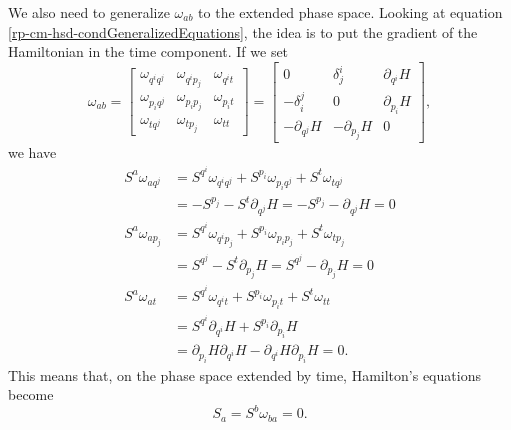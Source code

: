We also need to generalize $\omega_{ab}$ to the extended phase space. Looking at equation \ref{rp-cm-hsd-condGeneralizedEquations}, the idea is to put the gradient of the Hamiltonian in the time component. If we set
\begin{equation}\label{rp-cm-lm-contactForm}
	\tag{SF-E}
	\omega_{ab} = \left[\begin{array}{ccc}
		\omega_{q^i q^j} & \omega_{q^i p_j} & \omega_{q^i t} \\
		\omega_{p_i q^j} & \omega_{p_i p_j} & \omega_{p_i t} \\
		\omega_{t q^j} & \omega_{t p_j} & \omega_{t t} 
	\end{array} \right]= \left[\begin{array}{ccc}
		0 & \delta^i_j & \partial_{q^i} H \\
		- \delta_i^j & 0 & \partial_{p_i} H \\
		- \partial_{q^j} H & -\partial_{p_j} H & 0
	\end{array} \right] ,
\end{equation}
we have
\begin{equation}
	\begin{aligned}
		S^a \omega_{a q^j} &= S^{q^i}\omega_{q^i q^j} + S^{p_i}\omega_{p_i q^j} + S^{t} \omega_{t q^j} \\
		&= - S^{p_j} - S^{t} \partial_{q^j} H = - S^{p_j} -  \partial_{q^j} H = 0 \\
		S^a \omega_{a p_j} &= S^{q^i}\omega_{q^i p_j} + S^{p_i}\omega_{p_i p_j} + S^{t} \omega_{t p_j} \\
		&= S^{q^j} - S^{t} \partial_{p_j} H = S^{q^j} -  \partial_{p_j} H = 0 \\
		S^a \omega_{a t} &= S^{q^i}\omega_{q^i t} + S^{p_i}\omega_{p_i t} + S^{t} \omega_{t t} \\
		&= S^{q^i} \partial_{q^i} H + S^{p_i} \partial_{p_i} H \\
		&= \partial_{p_i} H \partial_{q^i} H - \partial_{q^i} H \partial_{p_i} H = 0.
	\end{aligned}
\end{equation}
This means that, on the phase space extended by time, Hamilton's equations become
\begin{equation}\label{rp-cm-lm-ExtPSEquation}
	\tag{HM-1E}
	S_a = S^b \omega_{ba} = 0.
\end{equation}

